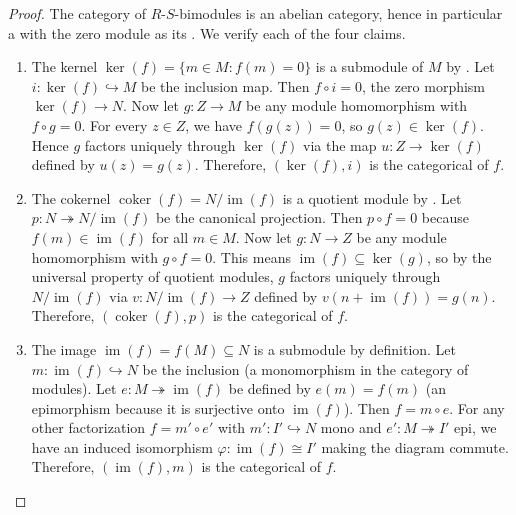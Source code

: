 \begin{proof}
    The category of $R$-$S$-bimodules is an abelian category, hence in particular a  with the zero module as its . We verify each of the four claims.

    \begin{enumerate}
        \item The kernel $\ker(f) = \{ m \in M : f(m) = 0 \}$ is a submodule of $M$ by . Let $i: \ker(f) \hookrightarrow M$ be the inclusion map. Then $f \circ i = 0$, the zero morphism $\ker(f) \to N$. Now let $g: Z \to M$ be any module homomorphism with $f \circ g = 0$. For every $z \in Z$, we have $f(g(z)) = 0$, so $g(z) \in \ker(f)$. Hence $g$ factors uniquely through $\ker(f)$ via the map $u: Z \to \ker(f)$ defined by $u(z) = g(z)$. Therefore, $(\ker(f), i)$ is the categorical  of $f$.

        \item The cokernel $\operatorname{coker}(f) = N / \operatorname{im}(f)$ is a quotient module by . Let $p: N \twoheadrightarrow N/\operatorname{im}(f)$ be the canonical projection. Then $p \circ f = 0$ because $f(m) \in \operatorname{im}(f)$ for all $m \in M$. Now let $g: N \to Z$ be any module homomorphism with $g \circ f = 0$. This means $\operatorname{im}(f) \subseteq \ker(g)$, so by the universal property of quotient modules, $g$ factors uniquely through $N/\operatorname{im}(f)$ via $v: N/\operatorname{im}(f) \to Z$ defined by $v(n + \operatorname{im}(f)) = g(n)$. Therefore, $(\operatorname{coker}(f), p)$ is the categorical  of $f$.

        \item The image $\operatorname{im}(f) = f(M) \subseteq N$ is a submodule by definition. Let $m: \operatorname{im}(f) \hookrightarrow N$ be the inclusion (a monomorphism in the category of modules). Let $e: M \twoheadrightarrow \operatorname{im}(f)$ be defined by $e(m) = f(m)$ (an epimorphism because it is surjective onto $\operatorname{im}(f)$). Then $f = m \circ e$. For any other factorization $f = m' \circ e'$ with $m': I' \hookrightarrow N$ mono and $e': M \twoheadrightarrow I'$ epi, we have an induced isomorphism $\varphi: \operatorname{im}(f) \cong I'$ making the diagram commute. Therefore, $(\operatorname{im}(f), m)$ is the categorical  of $f$.


\end{enumerate}
\end{proof}
